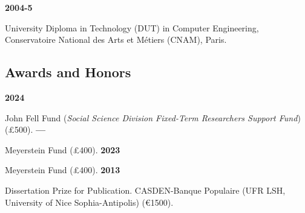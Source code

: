 \documentclass{article}
\newcommand{\fr}[1]{} %
\newcommand{\en}[1]{#1}   %
\begin{document}
\smallbreak
\textbf{2004-5} 
\fr{Diplôme universitaire de technologie (DUT) Génie informatique, Conservatoire National des Arts et Métiers (CNAM), Paris.}
\en{University Diploma in Technology (DUT) in Computer Engineering, Conservatoire National des Arts et Métiers (CNAM), Paris.}

\subsection*{\fr{Prix et récompenses}\en{Awards and Honors}}

\textbf{2024} 
\fr{Fonds John Fell (\textit{Social Science Division Fixed-Term Researchers Support Fund}) (£500).}
\en{John Fell Fund (\textit{Social Science Division Fixed-Term Researchers Support Fund}) (£500).}
\smallbreak
\textbf{--- } 
\fr{Fonds Meyerstein (£400).}
\en{Meyerstein Fund (£400).}
\smallbreak
\textbf{2023} 
\fr{Fonds Meyerstein (£400).}
\en{Meyerstein Fund (£400).}
\smallbreak
\textbf{2013} 
\fr{Prix de thèse pour publication. CASDEN-Banque Populaire (UFR LSH, Université Nice Sophia-Antipolis) (1500€).}
\en{Dissertation Prize for Publication. CASDEN-Banque Populaire (UFR LSH, University of Nice Sophia-Antipolis) (€1500).}
\end{document}
